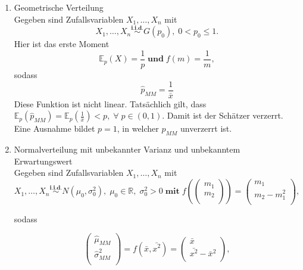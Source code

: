\documentclass[10pt]{article}
\newcommand{\FZV}{X_1, \ldots, X_n} %
\newcommand{\IR}{\mathbb{R}} %
\newcommand{\EW}{\mathbb{E}} %
\begin{document}
\begin{enumerate}
\begin{enumerate}[label = (\roman*)]
			\item Geometrische Verteilung \\
		Gegeben sind Zufallsvariablen $\FZV$ mit
		\begin{equation*}
			\FZV \overset{\textbf{i.i.d.}}{\sim} G(p_0), \; 0 < p_0 \leq 1.
		\end{equation*} 
		Hier ist das erste Moment
		\begin{equation*}
			\EW_p(X) = \frac{1}{p} \; \textbf{und} \;			f(m)=\frac{1}{m},
		\end{equation*}
		sodass
		\begin{equation*}
			\hat{p}_{MM} = \frac{1}{\bar{x}}
		\end{equation*}
		Diese Funktion ist nicht linear. Tatsächlich gilt, dass $\EW_p(\hat{p}_{MM}) = \EW_p (\frac{1}{\bar{x}}) < p, \; \forall  \; p \in (0,1)$. Damit ist der Schätzer verzerrt. Eine Ausnahme bildet $ p = 1 $, in welcher $\hat{p}_{MM}$  unverzerrt ist.
		
		\item Normalverteilung mit unbekannter Varianz und unbekanntem Erwartungswert\\
		Gegeben sind Zufallsvariablen $\FZV$ mit
		\begin{equation*}
			\FZV \overset{\textbf{i.i.d.}} {\sim} N(\mu_0,\sigma_0^2),\; \mu_0 \in \IR, \; \sigma_0^2 >0 \; \textbf{mit} \; 	f(\left(
			\begin{array}{c}
				m_1\\
				m_2\\
			\end{array}
			\right)) = 
			\left(
			\begin{array}{c}
				m_1\\
				m_2 - m_1^2\\
			\end{array}
			\right),
		\end{equation*} 
		
		sodass
		
		\begin{equation*}
			\left(
			\begin{array}{c}
				\hat{\mu}_{MM}\\
				\hat{\sigma}^2_{MM}\\
			\end{array}
			\right) = 
			f(\bar{x}, \bar{x^2})=
			\left(
			\begin{array}{c}
				\bar{x}\\
				\bar{x^2}-\bar{x}^2\\
			\end{array}
			\right),
		\end{equation*}
		

\end{enumerate}
\end{enumerate}
\end{document}
